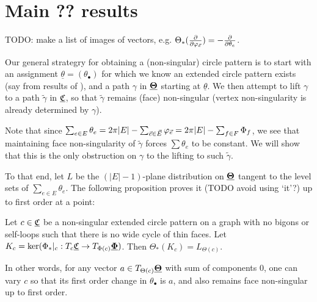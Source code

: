 \section{Main ?? results}


TODO: make a list of images of vectors, e.g.
$\Theta_*({\frac{\partial}{\partial \varphi_{\vec{e}}}}) = -{\frac{\partial}{\partial \theta_e}}$.


Our general strategry for obtaining a (non-singular) circle pattern
is to start with an assignment $\underline{\theta} = (\theta_\bullet)$
for which we know an extended circle pattern exists
(say from results of ),
and a path $\gamma$ in ${\underline{\mathbf{\Theta}}}$ starting at $\underline{\theta}$.
We then attempt to lift $\gamma$ to a path $\tilde{\gamma}$ in ${\underline{\mathfrak{C}}}$,
so that $\tilde{\gamma}$ remains (face) non-singular
(vertex non-singularity is already determined by $\gamma$).

Note that since $\sum_{e\in E} \theta_e
= 2\pi |E| - \sum_{\vec{e} \in \vec{E}} \varphi_{\vec{e}}
= 2\pi |E| - \sum_{f\in F} \Phi_f$,
we see that maintaining face non-singularity of $\tilde{\gamma}$
forces $\sum \theta_e$ to be constant.
We will show that this is the only obstruction on $\gamma$
to the lifting to such $\tilde{\gamma}$.

To that end, let $L$ be the $(|E|-1)$-plane distribution on ${\underline{\mathbf{\Theta}}}$
tangent to the level sets of $\sum_{e\in E} \theta_e$.
The following proposition proves it (TODO avoid using `it'?) up to first order at a point:


\begin{proposition}
\label{p:point_lift}
Let $c \in {\underline{\mathfrak{C}}}$ be a
non-singular extended circle pattern on a graph
with no bigons or self-loops such that
there is no wide cycle of thin faces.
Let $K_c = \ker (\Phi_*|_c : T_c {\underline{\mathfrak{C}}} \to T_{\Phi(c)} {\underline{\mathbf{\Phi}}})$.
Then $\Theta_*(K_c) = L_{\Theta(c)}$.

In other words, for any vector $a \in T_{\Theta(c)} {\underline{\mathbf{\Theta}}}$
with sum of components 0, one can vary $c$ so that its
first order change in $\theta_\bullet$ is $a$,
and also remains face non-singular up to first order.
\end{proposition}


